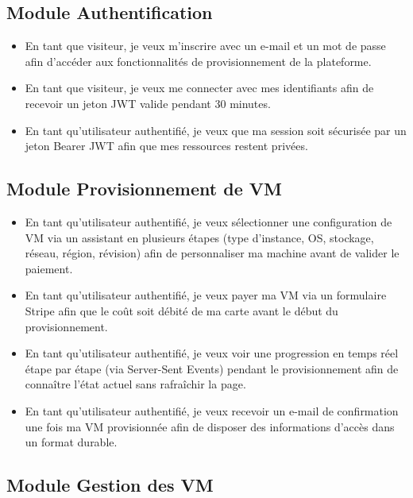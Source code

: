 \subsection{Module Authentification}

\begin{itemize}
  \item En tant que visiteur, je veux m'inscrire avec un e-mail et un mot de passe
        afin d'accéder aux fonctionnalités de provisionnement de la plateforme.
  \item En tant que visiteur, je veux me connecter avec mes identifiants afin de
        recevoir un jeton JWT valide pendant 30 minutes.
  \item En tant qu'utilisateur authentifié, je veux que ma session soit sécurisée par
        un jeton Bearer JWT afin que mes ressources restent privées.
\end{itemize}

\subsection{Module Provisionnement de VM}

\begin{itemize}
  \item En tant qu'utilisateur authentifié, je veux sélectionner une configuration de
        VM via un assistant en plusieurs étapes (type d'instance, OS, stockage, réseau,
        région, révision) afin de personnaliser ma machine avant de valider le paiement.
  \item En tant qu'utilisateur authentifié, je veux payer ma VM via un formulaire
        Stripe afin que le coût soit débité de ma carte avant le début du
        provisionnement.
  \item En tant qu'utilisateur authentifié, je veux voir une progression en temps réel
        étape par étape (via Server-Sent Events) pendant le provisionnement afin de
        connaître l'état actuel sans rafraîchir la page.
  \item En tant qu'utilisateur authentifié, je veux recevoir un e-mail de confirmation
        une fois ma VM provisionnée afin de disposer des informations d'accès dans un
        format durable.
\end{itemize}

\subsection{Module Gestion des VM}

